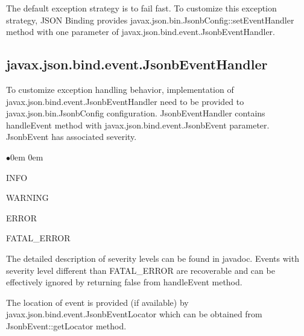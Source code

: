 The default exception strategy is to fail fast. To customize this exception strategy, JSON Binding provides javax.json.bin.JsonbConfig::setEventHandler method with one parameter of javax.json.bind.event.JsonbEventHandler.

\subsection{javax.json.bind.event.JsonbEventHandler}
\label{subsec:JsonbEventHandler}

To customize exception handling behavior, implementation of javax.json.bind.event.JsonbEventHandler need to be provided to javax.json.bin.JsonbConfig configuration. JsonbEventHandler contains handleEvent method with javax.json.bind.event.JsonbEvent parameter. JsonbEvent has associated severity.

\begin{list}{$\bullet$}{\parsep 0em  0em}
\item INFO
\item WARNING
\item ERROR
\item FATAL\_ERROR
\end{list}

The detailed description of severity levels can be found in javadoc. Events with severity level different than FATAL\_ERROR are recoverable and can be effectively ignored by returning false from handleEvent method.

The location of event is provided (if available) by javax.json.bind.event.JsonbEventLocator which can be obtained from JsonbEvent::getLocator method.
